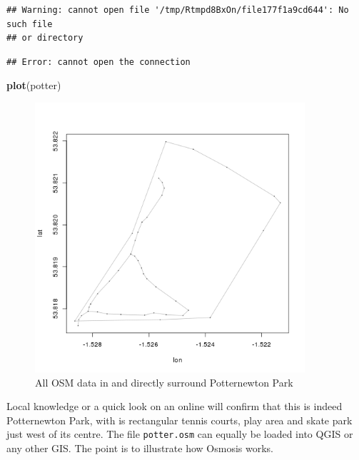 \documentclass[]{article}
\newenvironment{Shaded}{}{}
\newcommand{\KeywordTok}[1]{\textcolor[rgb]{0.00,0.44,0.13}{\textbf{{#1}}}}
\newcommand{\NormalTok}[1]{{#1}}
\let\Oldincludegraphics\includegraphics
\renewcommand{\includegraphics}[1]{\Oldincludegraphics[width=10cm]{#1}}
\begin{document}
\begin{verbatim}
## Warning: cannot open file '/tmp/Rtmpd8BxOn/file177f1a9cd644': No such file
## or directory
\end{verbatim}

\begin{verbatim}
## Error: cannot open the connection
\end{verbatim}

\begin{Shaded}
\begin{Highlighting}[]
\KeywordTok{plot}\NormalTok{(potter)}
\end{Highlighting}
\end{Shaded}

\begin{figure}[htbp]
\centering
\includegraphics{figure/All_OSM_data_in_and_directly_surround_Potternewton_Park.png}
\caption{All OSM data in and directly surround
Potternewton Park}
\end{figure}

Local knowledge or a quick look on an online will confirm that this is
indeed Potternewton Park, with is rectangular tennis courts, play area
and skate park just west of its centre. The file \texttt{potter.osm} can
equally be loaded into QGIS or any other GIS. The point is to illustrate
how Osmosis works.
\end{document}

